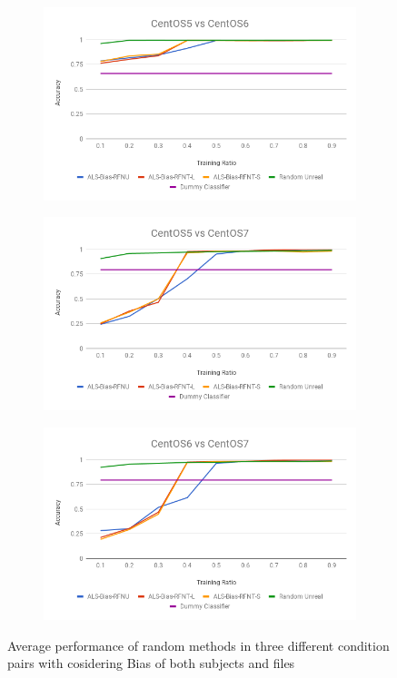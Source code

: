 \documentclass[10pt, conference, compsocconf]{IEEEtran}
\begin{document}
\begin{figure}[h!]
        \centering
        \begin{subfigure}[b]{0.8\linewidth}
                \includegraphics[width=\columnwidth]{figures/ALS-Bias/ALS-Bias-5vs6-PFS}
        \end{subfigure}
        \begin{subfigure}[b]{0.8\linewidth}
                \includegraphics[width=\columnwidth]{figures/ALS-Bias/ALS-Bias-5vs7-PFS}
        \end{subfigure}
        \begin{subfigure}[b]{0.8\linewidth}
                \includegraphics[width=\columnwidth]{figures/ALS-Bias/ALS-Bias-6vs7-PFS}
        \end{subfigure}
        \caption{Average performance of random methods in three different condition pairs with cosidering Bias of both subjects and files}
        \label{fig:ALS-Bias-PFS}
\end{figure}
\end{document}
